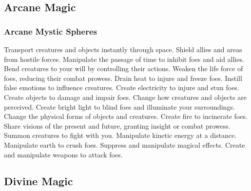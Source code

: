 
\small
\subsection{Arcane Magic}\label{Arcane Magic}
\subsubsection{Arcane Mystic Spheres}\label{Arcane Mystic Spheres}
\begin{spelllist}
 Transport creatures and objects instantly through space.
 Shield allies and areas from hostile forces.
 Manipulate the passage of time to inhibit foes and aid allies.
 Bend creatures to your will by controlling their actions.
 Weaken the life force of foes, reducing their combat prowess.
 Drain heat to injure and freeze foes.
 Instill false emotions to influence creatures.
 Create electricity to injure and stun foes.
 Create objects to damage and impair foes.
 Change how creatures and objects are perceived.
 Create bright light to blind foes and illuminate your surroundings.
 Change the physical forms of objects and creatures.
 Create fire to incinerate foes.
 Share visions of the present and future, granting insight or combat prowess.
 Summon creatures to fight with you.
 Manipulate kinetic energy at a distance.
 Manipulate earth to crush foes.
 Suppress and manipulate magical effects.
 Create and manipulate weapons to attack foes.
\end{spelllist}



\small
\subsection{Divine Magic}\label{Divine Magic}
